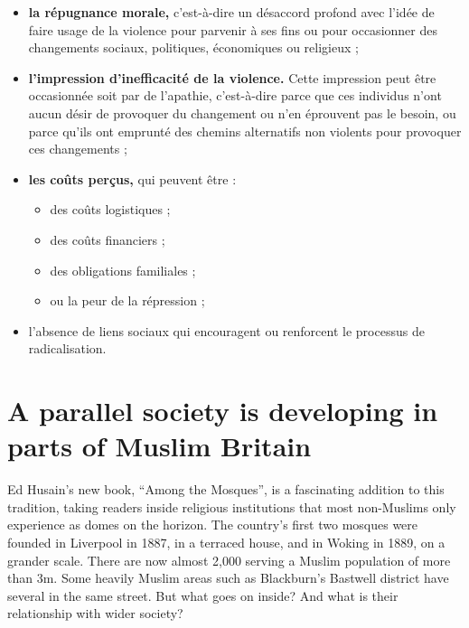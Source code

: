 \begin{itemize}
\item
  
  \textbf{la répugnance morale,} c'est-à-dire un désaccord profond avec
  l'idée de faire usage de la violence pour parvenir à ses fins ou pour
  occasionner des changements sociaux, politiques, économiques ou
  religieux ;
  
\item
  
  \textbf{l'impression d'inefficacité de la violence.} Cette impression
  peut être occasionnée soit par de l'apathie, c'est-à-dire parce que
  ces individus n'ont aucun désir de provoquer du changement ou n'en
  éprouvent pas le besoin, ou parce qu'ils ont emprunté des chemins
  alternatifs non violents pour provoquer ces changements ;
  
\item
  
  \textbf{les coûts perçus,} qui peuvent être :
  


\begin{itemize}
\item
  des coûts logistiques ;
\item
  des coûts financiers ;
\item
  des obligations familiales ;
\item
  ou la peur de la répression ;
 \end{itemize}

  \item
    
    l'absence de liens sociaux qui encouragent ou renforcent le
    processus de radicalisation.
    
 
\end{itemize}




\section{A parallel society is developing in parts of Muslim Britain}


Ed Husain’s new book, “Among the Mosques”, is a fascinating addition to this tradition, taking readers inside religious institutions that most non-Muslims only experience as domes on the horizon. The country’s first two mosques were founded in Liverpool in 1887, in a terraced house, and in Woking in 1889, on a grander scale. There are now almost 2,000 serving a Muslim population of more than 3m. Some heavily Muslim areas such as Blackburn’s Bastwell district have several in the same street. But what goes on inside? And what is their relationship with wider society?

